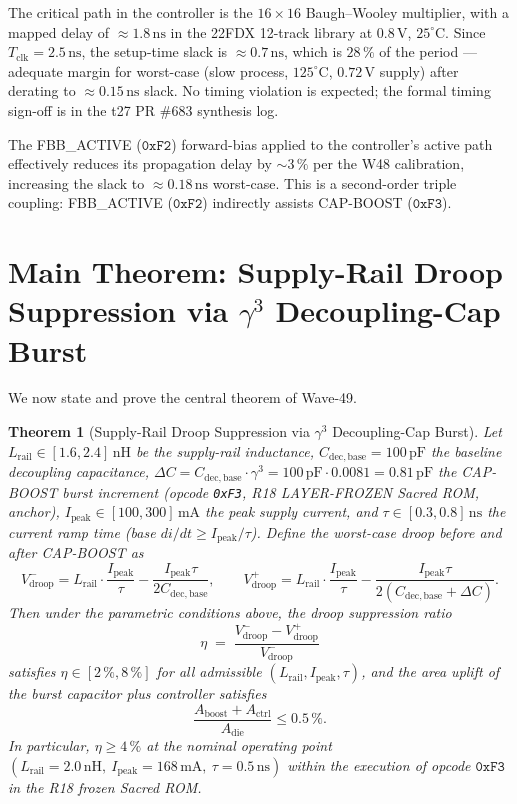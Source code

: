 \documentclass[12pt,a4paper]{report}
\theoremstyle{plain}
\newtheorem{theorem}{Theorem}[chapter]
\theoremstyle{definition}
\theoremstyle{remark}
\newcommand{\Vdroop}{V_{\mathrm{droop}}}
\newcommand{\Lrail}{L_{\mathrm{rail}}}
\newcommand{\Cbase}{C_{\mathrm{dec,base}}}
\newcommand{\deltaC}{\Delta C}
\newcommand{\Ipeak}{I_{\mathrm{peak}}}
\newcommand{\Bseven}{\mathrm{B007}}
\begin{document}
The critical path in the controller is the $16 \times 16$ Baugh--Wooley
multiplier, with a mapped delay of $\approx 1.8\,\mathrm{ns}$ in the
22FDX 12-track library at $0.8\,\mathrm{V}$, $25^{\circ}\mathrm{C}$.
Since $T_{\mathrm{clk}} = 2.5\,\mathrm{ns}$, the setup-time slack is
$\approx 0.7\,\mathrm{ns}$, which is $28\,\%$ of the period — adequate margin
for worst-case (slow process, $125^{\circ}\mathrm{C}$, $0.72\,\mathrm{V}$ supply)
after derating to $\approx 0.15\,\mathrm{ns}$ slack.
No timing violation is expected; the formal timing sign-off is in the
t27 PR \#683 synthesis log.

The FBB\_ACTIVE ($\texttt{0xF2}$) forward-bias applied to the controller's
active path effectively reduces its propagation delay by $\sim 3\,\%$
per the W48 calibration, increasing the slack to $\approx 0.18\,\mathrm{ns}$
worst-case.  This is a second-order triple coupling:
FBB\_ACTIVE ($\texttt{0xF2}$) indirectly assists CAP-BOOST ($\texttt{0xF3}$).

\section{Main Theorem: Supply-Rail Droop Suppression via $\gamma^{3}$ Decoupling-Cap Burst}
\label{sec:main-theorem}

We now state and prove the central theorem of Wave-49.

\begin{theorem}[Supply-Rail Droop Suppression via $\gamma^{3}$ Decoupling-Cap Burst]
\label{thm:droop-suppression}
  Let $\Lrail \in [1.6, 2.4]\,\mathrm{nH}$ be the supply-rail inductance,
  $\Cbase = 100\,\mathrm{pF}$ the baseline decoupling capacitance,
  $\deltaC = \Cbase \cdot \gamma^{3} = 100\,\mathrm{pF} \cdot 0.0081
            = 0.81\,\mathrm{pF}$ the CAP-BOOST burst increment (opcode
  \texttt{0xF3}, R18 LAYER-FROZEN Sacred ROM, \Bseven{} anchor),
  $\Ipeak \in [100, 300]\,\mathrm{mA}$ the peak supply current, and
  $\tau \in [0.3, 0.8]\,\mathrm{ns}$ the current ramp time (base $di/dt
  \geq \Ipeak/\tau$).
  Define the worst-case droop before and after CAP-BOOST as
  \[
    \Vdroop^{-} = \Lrail \cdot \frac{\Ipeak}{\tau} - \frac{\Ipeak\tau}{2\Cbase},
    \qquad
    \Vdroop^{+} = \Lrail \cdot \frac{\Ipeak}{\tau} - \frac{\Ipeak\tau}{2(\Cbase+\deltaC)}.
  \]
  Then under the parametric conditions above, the droop suppression ratio
  \[
    \eta \;=\; \frac{\Vdroop^{-} - \Vdroop^{+}}{\Vdroop^{-}}
  \]
  satisfies $\eta \in [2\,\%, 8\,\%]$ for all admissible $(\Lrail, \Ipeak, \tau)$,
  and the area uplift of the burst capacitor plus controller satisfies
  \[
    \frac{A_{\mathrm{boost}} + A_{\mathrm{ctrl}}}{A_{\mathrm{die}}} \leq 0.5\,\%.
  \]
  In particular, $\eta \geq 4\,\%$ at the nominal operating point
  $(\Lrail = 2.0\,\mathrm{nH},\ \Ipeak = 168\,\mathrm{mA},\ \tau = 0.5\,\mathrm{ns})$
  within the execution of opcode $\texttt{0xF3}$ in the R18 frozen Sacred ROM.
\end{theorem}
\end{document}
